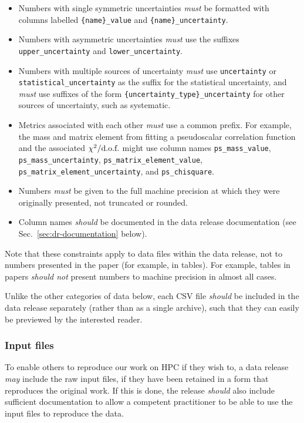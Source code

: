 \documentclass{article}
\newcommand\rfcword[1]{\emph{#1}\xspace}
\newcommand\must{\rfcword{must}}
\newcommand\should{\rfcword{should}}
\newcommand\shouldnot{\rfcword{should not}}
\newcommand\may{\rfcword{may}}
\begin{document}
\begin{itemize}
  \item
        Numbers with single symmetric uncertainties \must be formatted with columns labelled
        \verb|{name}_value| and \verb|{name}_uncertainty|.
  \item
        Numbers with asymmetric uncertainties \must use the suffixes
        \verb|upper_uncertainty| and \verb|lower_uncertainty|.
  \item
        Numbers with multiple sources of uncertainty \must use
        \verb|uncertainty| or \verb|statistical_uncertainty|
        as the suffix for the statistical uncertainty,
        and \must use suffixes of the form
        \verb|{uncertainty_type}_uncertainty|
        for other sources of uncertainty,
        such as systematic.
  \item
        Metrics associated with each other \must use a common prefix.
        For example,
        the mass and matrix element from fitting a pseudoscalar correlation function
        and the associated $\chi^{2}/\textnormal{d.o.f.}$
        might use column names
        \verb|ps_mass_value|,
        \verb|ps_mass_uncertainty|,
        \verb|ps_matrix_element_value|,
        \verb|ps_matrix_element_uncertainty|,
        and \verb|ps_chisquare|.
  \item
        Numbers \must be given to the full machine precision at which they were originally presented,
        not truncated or rounded.
  \item
        Column names \should be documented in the data release documentation
        (see Sec.~\ref{sec:dr-documentation} below).
\end{itemize}

Note that these constraints apply to data files within the data release,
not to numbers presented in the paper
(for example,
in tables).
For example,
tables in papers \shouldnot present numbers to machine precision in almost all cases.

Unlike the other categories of data below,
each CSV file \should be included in the data release separately
(rather than as a single archive),
such that they can easily be previewed by the interested reader.

\subsubsection{Input files}

To enable others to reproduce our work on HPC if they wish to,
a data release \may include the raw input files,
if they have been retained in a form that reproduces the original work.
If this is done,
the release \should also include sufficient documentation
to allow a competent practitioner to be able to use the input files to reproduce the data.
\end{document}
